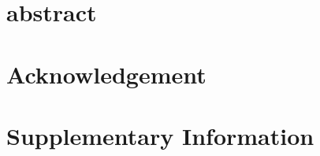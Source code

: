 \documentclass{article}
\begin{document}
\section{abstract}




\section{Acknowledgement}


\section{Supplementary Information}




\end{document}
